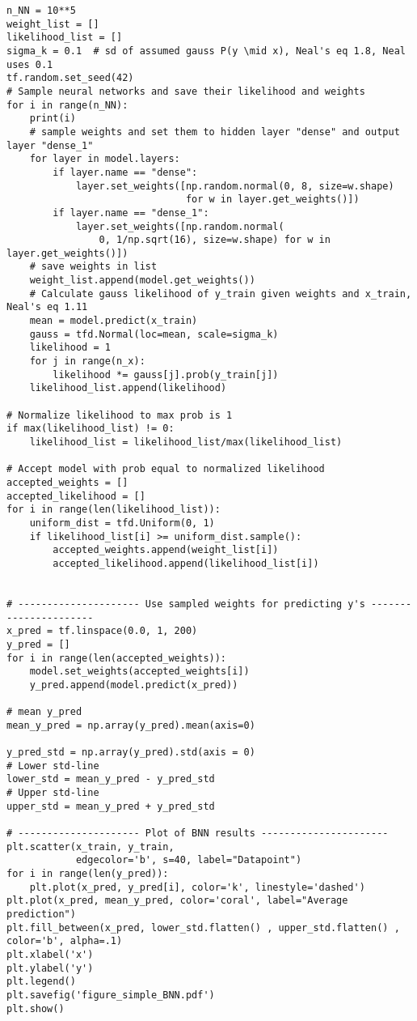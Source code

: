 \begin{appendices}
\begin{lstlisting}
n_NN = 10**5
weight_list = []
likelihood_list = []
sigma_k = 0.1  # sd of assumed gauss P(y \mid x), Neal's eq 1.8, Neal uses 0.1
tf.random.set_seed(42)
# Sample neural networks and save their likelihood and weights
for i in range(n_NN):
    print(i)
    # sample weights and set them to hidden layer "dense" and output layer "dense_1"
    for layer in model.layers:
        if layer.name == "dense":
            layer.set_weights([np.random.normal(0, 8, size=w.shape)
                               for w in layer.get_weights()])
        if layer.name == "dense_1":
            layer.set_weights([np.random.normal(
                0, 1/np.sqrt(16), size=w.shape) for w in layer.get_weights()])
    # save weights in list
    weight_list.append(model.get_weights())
    # Calculate gauss likelihood of y_train given weights and x_train, Neal's eq 1.11
    mean = model.predict(x_train)
    gauss = tfd.Normal(loc=mean, scale=sigma_k)
    likelihood = 1
    for j in range(n_x):
        likelihood *= gauss[j].prob(y_train[j])
    likelihood_list.append(likelihood)

# Normalize likelihood to max prob is 1
if max(likelihood_list) != 0:
    likelihood_list = likelihood_list/max(likelihood_list)

# Accept model with prob equal to normalized likelihood
accepted_weights = []
accepted_likelihood = []
for i in range(len(likelihood_list)):
    uniform_dist = tfd.Uniform(0, 1)
    if likelihood_list[i] >= uniform_dist.sample():
        accepted_weights.append(weight_list[i])
        accepted_likelihood.append(likelihood_list[i])


# --------------------- Use sampled weights for predicting y's ----------------------
x_pred = tf.linspace(0.0, 1, 200)
y_pred = []
for i in range(len(accepted_weights)):
    model.set_weights(accepted_weights[i])
    y_pred.append(model.predict(x_pred))

# mean y_pred
mean_y_pred = np.array(y_pred).mean(axis=0)

y_pred_std = np.array(y_pred).std(axis = 0)
# Lower std-line
lower_std = mean_y_pred - y_pred_std 
# Upper std-line
upper_std = mean_y_pred + y_pred_std

# --------------------- Plot of BNN results ----------------------
plt.scatter(x_train, y_train,
            edgecolor='b', s=40, label="Datapoint")
for i in range(len(y_pred)):
    plt.plot(x_pred, y_pred[i], color='k', linestyle='dashed')
plt.plot(x_pred, mean_y_pred, color='coral', label="Average prediction")
plt.fill_between(x_pred, lower_std.flatten() , upper_std.flatten() , color='b', alpha=.1)
plt.xlabel('x')
plt.ylabel('y')
plt.legend()
plt.savefig('figure_simple_BNN.pdf')
plt.show()


\end{lstlisting}
\end{appendices}
